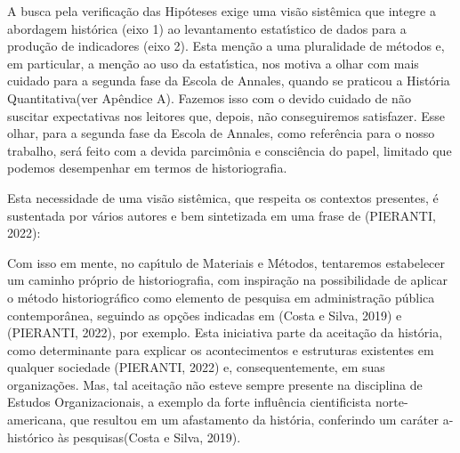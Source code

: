 \documentclass[
12pt,		%
openright,	%
twoside,  %
a4paper,			%
chapter=TITLE,		%
english,			%
french,				%
spanish,			%
brazil				%
]{USPSC-classe/USPSC}
\begin{document}
A busca pela verifica\c{c}\~ao das Hip\'oteses exige uma vis\~ao sist\^emica que integre a abordagem hist\'orica (eixo 1) ao levantamento estat\'{\i}stico de dados para a produ\c{c}\~ao de indicadores (eixo 2). Esta men\c{c}\~ao a uma pluralidade de m\'etodos e, em particular, a men\c{c}\~ao ao uso da estat\'{\i}stica, nos motiva a olhar com mais cuidado para a segunda fase da Escola de Annales, quando se praticou a \textquotedbl Hist\'oria Quantitativa\textquotedbl  (ver Ap\^endice A). Fazemos isso com o devido cuidado de n\~ao suscitar expectativas nos leitores que, depois, n\~ao conseguiremos satisfazer. Esse olhar, para a segunda fase da Escola de Annales, como refer\^encia para o nosso trabalho, ser\'a feito com a devida parcim\^onia e consci\^encia do papel, limitado que podemos desempenhar em termos de historiografia.









Esta necessidade de uma vis\~ao sist\^emica, que respeita os contextos presentes, \'e sustentada por v\'arios autores e bem sintetizada em uma frase de (PIERANTI, 2022):










\noindent\begin{center}\mbox{\centering{}}\end{center}


Com isso em mente, no cap\'{\i}tulo de Materiais e M\'etodos, tentaremos estabelecer um caminho pr\'oprio de historiografia, com inspira\c{c}\~ao na possibilidade de aplicar o m\'etodo historiogr\'afico como elemento de pesquisa em administra\c{c}\~ao p\'ublica contempor\^anea, seguindo as op\c{c}\~oes indicadas em  (Costa e Silva, 2019) e (PIERANTI, 2022), por exemplo. Esta iniciativa parte da aceita\c{c}\~ao da hist\'oria, como determinante para explicar os acontecimentos e estruturas existentes em qualquer sociedade (PIERANTI, 2022) e, consequentemente, em suas organiza\c{c}\~oes. Mas, tal aceita\c{c}\~ao n\~ao esteve sempre presente na disciplina de Estudos Organizacionais, a exemplo da \textquotedbl forte influ\^encia cientificista norte-americana, que resultou em um afastamento da hist\'oria, conferindo um car\'ater a-hist\'orico \`as pesquisas\textquotedbl  (Costa e Silva, 2019).
\end{document}
